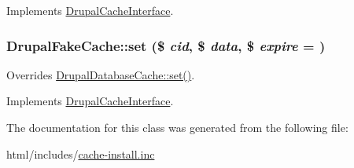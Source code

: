 Implements \hyperlink{interfaceDrupalCacheInterface_a54fa3e2f8e11cbb551d5168c9f22c720}{DrupalCacheInterface}.\hypertarget{classDrupalFakeCache_a54b3264101045168404dc3cedcfce970}{
\subsubsection[{set}]{\setlength{\rightskip}{0pt plus 5cm}DrupalFakeCache::set (\$ {\em cid}, \/  \$ {\em data}, \/  \$ {\em expire} = {})}}
\label{classDrupalFakeCache_a54b3264101045168404dc3cedcfce970}
Overrides \hyperlink{classDrupalDatabaseCache_a8262bd7a36ca026f6b8c31c30c0f722d}{DrupalDatabaseCache::set()}. 

Implements \hyperlink{interfaceDrupalCacheInterface_ab9bbd1913d6747a74585f36b9282594c}{DrupalCacheInterface}.

The documentation for this class was generated from the following file:\begin{DoxyCompactItemize}
\item 
html/includes/\hyperlink{cache-install_8inc}{cache-\/install.inc}\end{DoxyCompactItemize}
